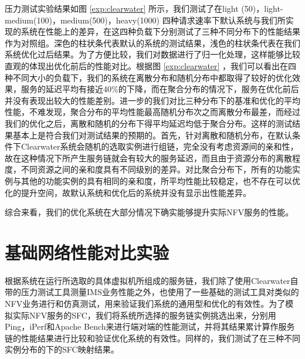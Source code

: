 压力测试实验结果如图 \ref{exp:clearwater} 所示，我们测试了在light (50)，light-medium(100)，medium(500)，heavy(1000) 四种请求速率下默认系统与我们所实现的系统在性能上的差异，在这四种负载下分别测试了三种不同分布下的性能结果作为对照组。深色的柱状条代表默认的系统的测试结果，浅色的柱状条代表在我们系统优化过后结果。为了方便比较，我们对数据进行了归一化处理，这样能够比较直观的体现出优化前后的性能对比。根据图 \ref{exp:clearwater} ，我们可以看出在四种不同大小的负载下，我们的系统在离散分布和随机分布中都取得了较好的优化效果，服务的延迟平均有接近40\%的下降，而在聚合分布的情况下，服务在优化前后并没有表现出较大的性能差别。进一步的我们对比三种分布下的基准和优化的平均性能，不难发现，聚合分布的平均性能最高随机分布次之而离散分布最差，而经过我们的优化之后，离散和随机的分布下得平均延迟均低于聚合分布。这样的测试结果基本上是符合我们对测试结果的预期的。首先，针对离散和随机分布，在默认条件下Clearwater系统会随机的选取实例进行组链，完全没有考虑资源间的亲和性，故在这种情况下所产生服务链就会有较大的服务延迟，而且由于资源分布的离散程度，不同资源之间的亲和度具有不同级别的差异。对比聚合分布下，所有的功能实例与其他的功能实例的具有相同的亲和度，所平均性能比较稳定，也不存在可以优化的提升空间，故默认系统和优化后的系统并没有显示出性能差异。

综合来看，我们的优化系统在大部分情况下确实能够提升实际NFV服务的性能。

\section{基础网络性能对比实验}
根据系统在运行所选取的具体虚拟机所组成的服务链，我们除了使用Clearwater自带的压力测试工具测量IMS业务性能之外，也使用了一些基础的测试工具对类似的NFV业务进行和仿真测试，用来验证我们系统的通用型和优化的有效性。为了模拟实际NFV服务的SFC，我们将系统所选择的服务链实例挑选出来，分别用Ping，iPerf和Apache Bench来进行端对端的性能测试，并将其结果累计算作服务链的性能结果进行比较和验证优化系统的有效性。同样的，我们测试了在三种不同实例分布的下的SFC映射结果。

